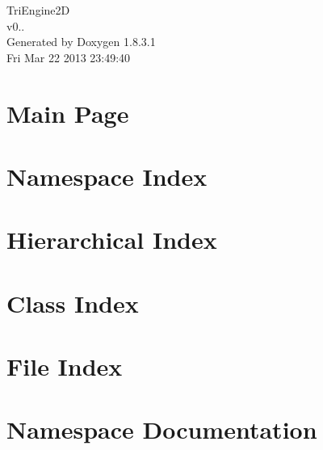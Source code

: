 \documentclass{book}
\begin{document}
\hypersetup{pageanchor=false,citecolor=blue}
\begin{titlepage}
\vspace*{7cm}
\begin{center}
{\Large Tri\-Engine2\-D \\[1ex]\large v0.. }\\
\vspace*{1cm}
{\large Generated by Doxygen 1.8.3.1}\\
\vspace*{0.5cm}
{\small Fri Mar 22 2013 23:49:40}\\
\end{center}
\end{titlepage}
\clearemptydoublepage
{}
\tableofcontents
\clearemptydoublepage
{}
\hypersetup{pageanchor=true,citecolor=blue}
\chapter{Main Page}
\label{index}\hypertarget{index}{}
\chapter{Namespace Index}

\chapter{Hierarchical Index}

\chapter{Class Index}

\chapter{File Index}

\chapter{Namespace Documentation}
















\end{document}

